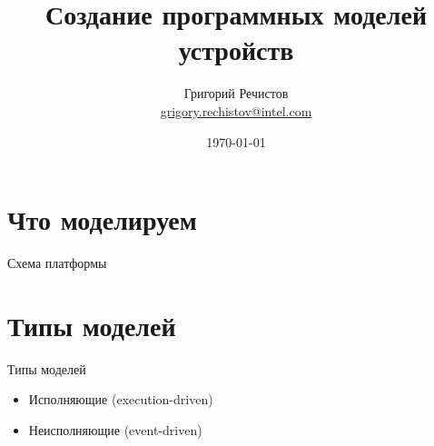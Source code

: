 \documentclass{beamer}
\title{Создание программных моделей устройств}
\author[Григорий Речистов]{Григорий Речистов \\ \small{\href{mailto:grigory.rechistov@intel.com}{grigory.rechistov@intel.com}}}
\date{\today}
\begin{document}
\begin{frame}
\titlepage
\end{frame}

\begin{frame}
\tableofcontents
\end{frame} 

\section{Что моделируем}

\begin{frame}{Схема платформы}

\begin{tikzpicture}[>=latex, font=\small]


\end{tikzpicture}

\end{frame} 

\section{Типы моделей}

\begin{frame}{Типы моделей}

\begin{itemize}
\item Исполняющие (execution-driven)
\item Неисполняющие (event-driven)

\end{itemize}






\end{frame}
\end{document}
